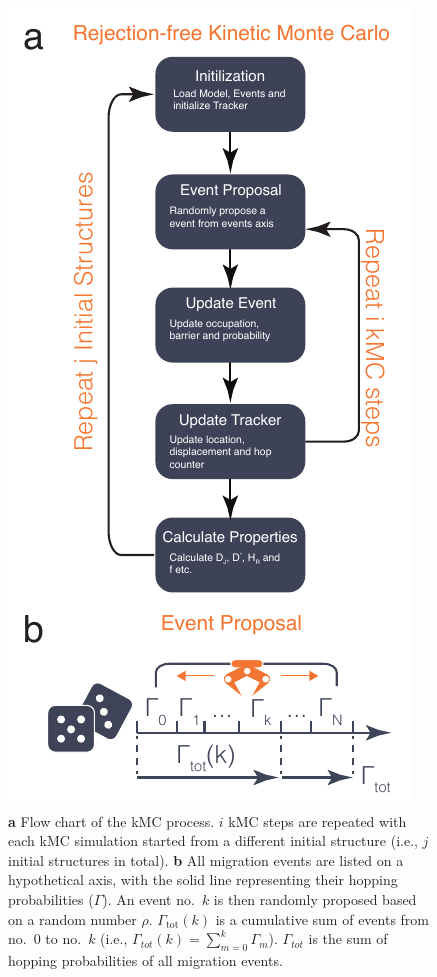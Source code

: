 \documentclass[a4paper,fleqn]{cas-dc}
\begin{document}
{\begin{figure}[t]
    \centering
    \includegraphics[width=0.8\columnwidth]{Figures/kmc.pdf}
    \caption{\textbf{a} Flow chart of the kMC process. $i$ kMC steps are repeated with each kMC simulation started from a different initial structure (i.e., $j$ initial structures in total).  \textbf{b} All migration events are listed on a hypothetical axis, with the solid line representing their hopping probabilities ($\Gamma$). An event no.\ $k$ is then randomly proposed based on a random number $\rho$. $\Gamma_\mathrm{tot}(k)$ is a cumulative sum of events from no.\ $0$ to no.\ $k$ (i.e., $\Gamma_{tot}(k)=\sum_{m=0}^k\Gamma_m$).  $\Gamma_{tot}$ is the sum of hopping probabilities of all migration events.}
    \label{fig:kmc}
\end{figure}

}
\end{document}
